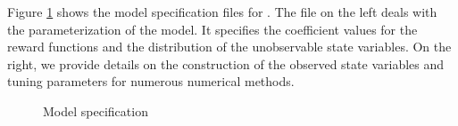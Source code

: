 \noindent Figure \ref{Model specification} shows the model specification files for \citet{Keane.1994}. The file on the left deals with the parameterization of the model. It specifies the coefficient values for the reward functions and the distribution of the unobservable state variables. On the right, we provide details on the construction of the observed state variables and tuning parameters for numerous numerical methods.

\begin{figure}[h!]\centering
\caption{Model specification}\label{Model specification}
\hspace{0.3cm}
\end{figure}\FloatBarrier
